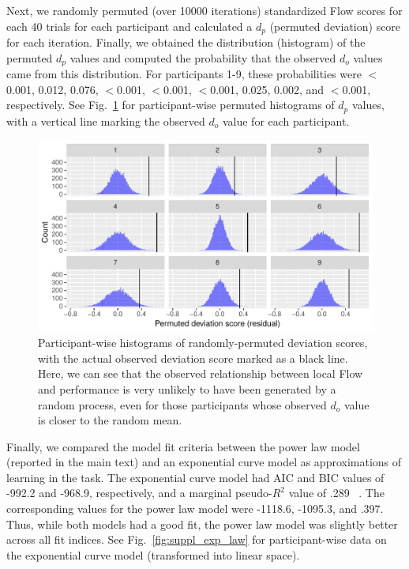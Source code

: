 \documentclass[fleqn,10pt]{wlscirep}
\begin{document}
Next, we randomly permuted (over 10000 iterations) standardized Flow scores for each 40 trials for each participant and calculated a $d_p$ (permuted deviation) score for each iteration. Finally, we obtained the distribution (histogram) of the permuted $d_p$ values and computed the probability that the observed $d_o$ values came from this distribution. For participants 1-9, these probabilities were $<$0.001, 0.012, 0.076, $<$0.001, $<$0.001, $<$0.001, 0.025, 0.002, and $<$0.001, respectively. See Fig.~\ref{fig:suppl_permute_cogcar} for participant-wise permuted histograms of $d_p$ values, with a vertical line marking the observed $d_o$ value for each participant.

\begin{figure}[!h]%
\centering
\includegraphics[width=\linewidth]{suppl_permute_cogcar}
\caption{Participant-wise histograms of randomly-permuted deviation scores, with the actual observed deviation score marked as a black line. Here, we can see that the observed relationship between local Flow and performance is very unlikely to have been generated by a random process, even for those participants whose observed $d_o$ value is closer to the random mean.}
\label{fig:suppl_permute_cogcar}
\end{figure}

Finally, we compared the model fit criteria between the power law model (reported in the main text) and an exponential curve model as approximations of learning in the task. The exponential curve model had AIC and BIC values of -992.2 and -968.9, respectively, and a marginal pseudo-$R^2$ value of .289 ~\cite{nakagawa2013general}. The corresponding values for the power law model were -1118.6, -1095.3, and .397. Thus, while both models had a good fit, the power law model was slightly better across all fit indices. See Fig.~\ref{fig:suppl_exp_law} for participant-wise data on the exponential curve model (transformed into linear space).
\end{document}
